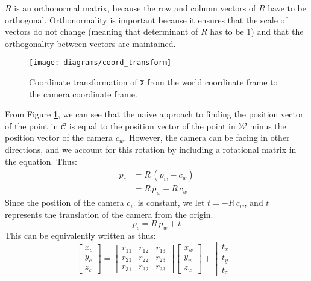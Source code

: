 $R$ is an orthonormal matrix, because the row and column vectors of $R$ have to be orthogonal. Orthonormality is important because it ensures that the scale of vectors do not change (meaning that determinant of $R$ has to be 1) and that the orthogonality between vectors are maintained.

\begin{figure}[H]
    \centering
    \texttt{[image: diagrams/coord\_transform]}
    \caption{Coordinate transformation of $\mathtt{X}$ from the world coordinate frame to the camera coordinate frame.}
    \label{fig:ext}
\end{figure}

From Figure \ref{fig:ext}, we can see that the naive approach to finding the position vector of the point in $\mathcal{C}$  is equal to the position vector of the point in $\mathcal{W}$ minus the position vector of the camera $c_w$. However, the camera can be facing in other directions, and we account for this rotation by including a rotational matrix in the equation. Thus:
\begin{align}
    p_c & = R\,(p_w-c_w) \nonumber \\
        & = R\,p_w -R\,c_w
\end{align}
Since the position of the camera $c_w$ is constant, we let $t = -R\,c_w$, and $t$ represents the translation of the camera from the origin.
\begin{equation}
    p_c = R\,p_w + t
\end{equation}
This can be equivalently written as thus:
\begin{equation*}
    \begin{bmatrix}
        x_c \\ y_c \\ z_c
    \end{bmatrix}
    =
    \begin{bmatrix}
        r_{11} & r_{12} & r_{13} \\
        r_{21} & r_{22} & r_{23} \\
        r_{31} & r_{32} & r_{33}
    \end{bmatrix}
    \begin{bmatrix}
        x_w \\ y_w \\ z_w
    \end{bmatrix}
    +
    \begin{bmatrix}
        t_x \\ t_y \\ t_z
    \end{bmatrix}
\end{equation*}
